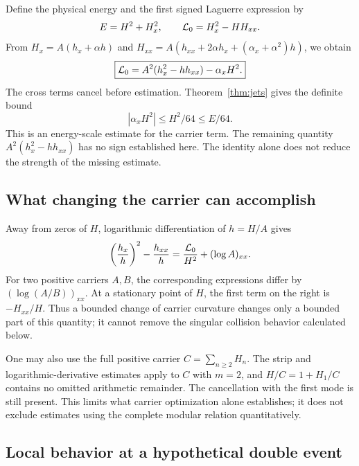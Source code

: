 Define the physical energy and the first signed Laguerre expression by
\begin{equation}\label{eq:energy}
 E=H^2+H_x^2,\qquad \mathcal L_0=H_x^2-HH_{xx}.
\end{equation}
From $H_x=A(h_x+\alpha h)$ and
$H_{xx}=A(h_{xx}+2\alpha h_x+(\alpha_x+\alpha^2)h)$, we obtain
\begin{equation}\label{eq:laguerre-normalized}
 \boxed{\mathcal L_0=A^2(h_x^2-hh_{xx})-\alpha_xH^2.}
\end{equation}
The cross terms cancel before estimation. Theorem~\ref{thm:jets} gives
the definite bound
\begin{equation}\label{eq:payment}
 |\alpha_x H^2|\le H^2/64\le E/64.
\end{equation}
This is an energy-scale estimate for the carrier term. The remaining
quantity $A^2(h_x^2-hh_{xx})$ has no sign established here.
The identity alone does not reduce the strength of the missing estimate.

\subsection{What changing the carrier can accomplish}

Away from zeros of $H$, logarithmic differentiation of $h=H/A$ gives
\begin{equation}\label{eq:carrier-invariance}
 \left(\frac{h_x}{h}\right)^2-\frac{h_{xx}}h
 =\frac{\mathcal L_0}{H^2}+(\log A)_{xx}.
\end{equation}
For two positive carriers $A,B$, the corresponding expressions differ
by $(\log(A/B))_{xx}$. At a stationary point of $H$, the first term on the
right is $-H_{xx}/H$. Thus a bounded change of carrier curvature changes
only a bounded part of this quantity; it cannot remove the singular
collision behavior calculated below.

One may also use the full positive carrier $C=\sum_{n\ge2}H_n$.
The strip and logarithmic-derivative estimates apply to $C$ with $m=2$,
and $H/C=1+H_1/C$ contains no omitted arithmetic remainder. The cancellation
with the first mode is still present. This limits what carrier optimization
alone establishes; it does not exclude estimates using the complete modular
relation quantitatively.

\subsection{Local behavior at a hypothetical double event}

